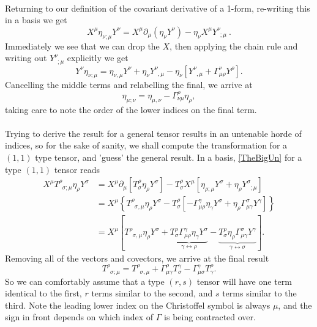 \documentclass[11pt,fleqn]{report}
\begin{document}
\paragraph{} Returning to our definition of the covariant derivative of a 1-form, re-writing this in a basis we get \begin{equation}
X^\mu \eta_{\nu;\mu} Y^\nu = X^\mu \partial_\mu(\eta_\nu Y^\nu)-\eta_\nu X^\mu Y^\nu_{\phantom v ;\mu}\:.
\end{equation}
Immediately we see that we can drop the $X$, then applying the chain rule and writing out $Y^\nu_{\phantom v ;\mu}$ explicitly we get\begin{equation}
Y^\nu \eta_{\nu;\mu} = \eta_{\nu,\mu}Y^\nu + \eta_\nu Y^\nu_{\phantom v ,\mu}-\eta_\nu\left[Y^\nu_{\phantom v ,\mu}+\Gamma^\nu_{\mu\rho}Y^\rho\right].
\end{equation}
Cancelling the middle terms and relabelling the final, we arrive at\begin{equation}
\eta_{\mu ; \nu} = \eta_{\mu,\nu} - \Gamma^\rho_{\nu\mu}\eta_\rho,
\end{equation}
taking care to note the order of the lower indices on the final term.

\paragraph{}Trying to derive the result for a general tensor results in an untenable horde of indices, so for the sake of sanity, we shall compute the transformation for a $(1,1)$ type tensor, and 'guess' the general result. In a basis, \eqref{TheBigUn} for a type $(1,1)$ tensor reads
\begin{align}
	X^\mu T^\rho_{\phantom{\rho}\sigma;\mu} \eta_\rho Y^\sigma &= X^\mu \partial_\mu \left[T^{\rho}_{\sigma}\eta_\rho Y^\sigma\right] 
	- T^{\rho}_{\sigma}X^\mu\left[\eta_{\rho;\mu}Y^\sigma + \eta_\rho Y^\sigma_{\phantom{\sigma};\mu}\right]\\
	&=X^\mu\left\{ T^\rho_{\phantom{\rho}\sigma,\mu}\eta_\rho Y^\sigma -T^\rho_\sigma\left[-\Gamma_{\mu\rho}^\gamma \eta_\gamma Y^\sigma 
	+ \eta_\rho \Gamma_{\mu\gamma}^\sigma Y^\gamma \right] \right\}\\
	&= X^\mu\left[T^\rho_{\phantom{\rho}\sigma,\mu}\eta_\rho Y^\sigma 
	+\underbrace{T^\rho_\sigma\Gamma_{\mu\rho}^\gamma \eta_\gamma Y^\sigma}_{\gamma\leftrightarrow\rho}
	-\underbrace{T^\rho_\sigma\eta_\rho \Gamma_{\mu\gamma}^\sigma Y^\gamma}_{\gamma\leftrightarrow\sigma} \right].
\end{align}
Removing all of the vectors and covectors, we arrive at the final result\begin{equation}
	T^\rho_{\phantom{\rho}\sigma;\mu} = T^\rho_{\phantom p \sigma , \mu} + \Gamma_{\mu\gamma}^\rho T^\gamma_\sigma - \Gamma^\gamma_{\mu\sigma}T^\rho_\gamma.
\end{equation}
So we can comfortably assume that a type $(r,s)$ tensor will have one term identical to the first, $r$ terms similar to the second, and $s$ terms similar to the third. Note the leading lower index on the Christoffel symbol is always $\mu$, and the sign in front depends on which index of $\Gamma$ is being contracted over.
\end{document}
